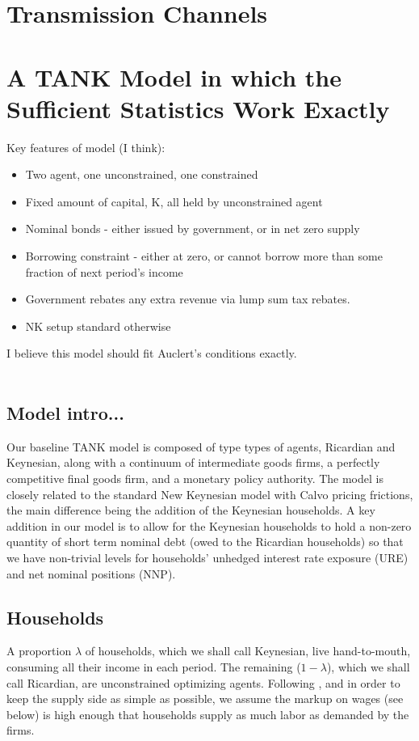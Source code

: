 \documentclass[titlepage]{\econtex}\newcommand{\texname}{ConsumptionHeterogeneity}
\begin{document}
\section{Transmission Channels} \label{transmission_channels}

\section{A TANK Model in which the Sufficient Statistics Work Exactly}
Key features of model (I think):
\begin{itemize}
	\item Two agent, one unconstrained, one constrained
	\item Fixed amount of capital, K, all held by unconstrained agent
	\item Nominal bonds - either issued by government, or in net zero supply
	\item Borrowing constraint - either at zero, or cannot borrow more than some fraction of next period's income
	\item Government rebates any extra revenue via lump sum tax rebates.
	\item NK setup standard otherwise
\end{itemize}
I believe this model should fit Auclert's conditions exactly.\\
\\
\subsection{Model intro...}
Our baseline TANK model is composed of type types of agents, Ricardian and Keynesian, along with a continuum of intermediate goods firms, a perfectly competitive final goods firm, and a monetary policy authority. The model is closely related to the standard New Keynesian model with Calvo pricing frictions, the main difference being the addition of the Keynesian households. A key addition in our model is to allow for the Keynesian households to hold a non-zero quantity of short term nominal debt (owed to the Ricardian households) so that we have non-trivial levels for households' unhedged interest rate exposure (URE) and net nominal positions (NNP).

\subsection{Households}
A proportion $\lambda$ of households, which we shall call Keynesian, live hand-to-mouth, consuming all their income in each period. The remaining ($1-\lambda$), which we shall call Ricardian, are unconstrained optimizing agents. Following \cite{dgHANKTANK}, and in order to keep the supply side as simple as possible, we assume the markup on wages (see below) is high enough that households supply as much labor as demanded by the firms.
\end{document}
